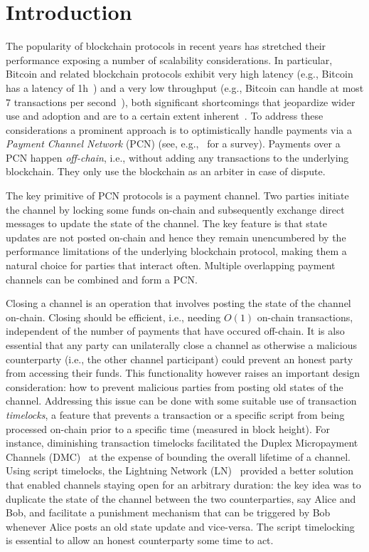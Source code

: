 \section{Introduction}
  The popularity of blockchain protocols in recent years has stretched their
  performance exposing a number of scalability considerations. In particular,
  Bitcoin and related blockchain protocols exhibit very high latency (e.g.,
  Bitcoin has a latency of 1h~\cite{bitcoin}) and a very low throughput (e.g.,
  Bitcoin can handle at most 7 transactions per second~\cite{scaling}), both
  significant shortcomings that jeopardize wider use and adoption and are to a
  certain extent inherent~\cite{scaling}. To address these considerations a
  prominent approach is to optimistically handle payments via a \emph{Payment
  Channel Network} (PCN) (see, e.g.,~\cite{DBLP:conf/fc/GudgeonMRMG20} for a
  survey). Payments over a PCN happen \emph{off-chain}, i.e., without adding any
  transactions to the underlying blockchain. They only use the blockchain as an
  arbiter in case of dispute.

The key primitive of PCN protocols is a payment channel. Two parties initiate
the channel by locking some funds on-chain and subsequently exchange direct
messages to update the state of the channel. The key feature is that state
updates are not posted on-chain and hence they remain unencumbered by the
performance limitations of the underlying blockchain protocol, making them a
natural choice for parties that interact often. Multiple overlapping payment
channels can be combined and form a PCN.

Closing a channel is an operation that involves posting the state of the channel
on-chain. Closing should be efficient, i.e., needing $O(1)$ on-chain
transactions, independent of the number of payments that have occured off-chain.
It is also essential that any party can unilaterally close a channel as
otherwise a malicious counterparty (i.e., the other channel participant) could
prevent an honest party from accessing their funds. This functionality however
raises an important design consideration: how to prevent malicious parties from
posting old states of the channel.
%
Addressing this issue can be done with some suitable use of transaction
\emph{timelocks}, a feature that prevents a transaction or a specific script from
being processed on-chain prior to a specific time (measured in block height).
%
For instance, diminishing transaction timelocks facilitated the Duplex
Micropayment Channels (DMC)~\cite{decker} at the expense of bounding the overall
lifetime of a channel. Using script timelocks, the Lightning Network
(LN)~\cite{lightning} provided a better solution that enabled channels staying
open for an arbitrary duration: the key idea was to duplicate the state of the
channel between the two counterparties, say Alice and Bob, and facilitate a
punishment mechanism that can be triggered by Bob whenever Alice posts an old
state update and vice-versa. The script timelocking is essential to allow an
honest counterparty some time to act.

